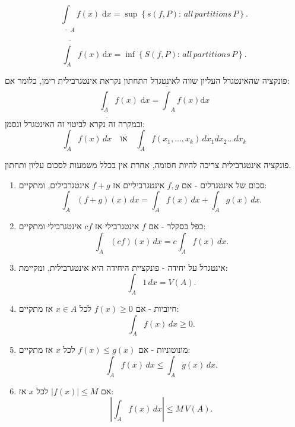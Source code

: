 \documentclass{tstextbook}
\begin{document}
\begin{definition}
$$\underline{\int}_{A}f(x) \;\mathrm{d}x=\operatorname*{sup}\left\{s(f,P):\,a l l\,p a r t i t i o n s\,P\right\}.$$

\end{definition}
\begin{definition}
$${\overline{{\int}_{A}}}f(x)\,\mathrm{d} x=\operatorname*{inf}\left\{S(f,P):\,a l l\,p a r t i t i o n s\,P\right\}.$$

\end{definition}
\begin{definition}
פונקציה שהאינטגרל העליון שווה לאינטגרל התחתון נקראת אינטגרבילית רימן, כלומר אם:
$$\underline{\int_{A}} f(x)\;\mathrm{d}x=\overline{\int}_{A}f(x)\mathrm{d}x$$
ובמקרה זה נקרא לביטוי זה האינטגרל ונסמן:
$$\int_{A}f(x)\,d x\quad \text{או}\quad\int_{A}f\left( x_{1},\ldots,x_{k} \right)\,d x_{1}d x_{2}\ldots d x_{k}$$

\end{definition}
\begin{remark}
פונקציה אינטגרבילית צריכה להיות חסומה, אחרת אין בכלל משמעות לסכום עליון ותחתון.

\end{remark}
\begin{proposition}
  \begin{enumerate}
    \item סכום של אינטגרלים - אם \(f,g\) אינטגרביליים אז \(f+g\)  אינטגרבילים, ומתקיים: 
$$\int_{A}(f+g)(x)\,d x=\int_{A}f(x)\,d x+\int_{A}g(x)\,d x.$$


    \item כפל בסקלר - אם \(f\) אינטגרבילי אז \(cf\) אינטגרבילי ומתקיים: 
$$\int_{A}(c f)(x)\,d x=c\int_{A}f(x)\,d x.$$


    \item אינטגרל על יחידה - פונקציית היחידה היא אינטגרבילית, ומקיימת: 
$$\int_{A}1\,d x=V(A).$$


    \item חיוביות - אם \(f(x)\geq 0\) לכל \(x \in A\) אז מתקיים: 
$$\int_{A}f(x)\,d x\geq0.$$


    \item מונוטוניות - אם \(f(x)\leq g(x)\) לכל \(x\) אז מתקיים: 
$$\int_{A}f(x)\,d x\leq\int_{A}g(x)\,d x.$$


    \item אם \(|f(x)|\leq M\) לכל \(x\) אז: 
$$\left|\int_{A}f(x)\,d x\right|\leq M\,V(A).$$


  \end{enumerate}
\end{proposition}
\end{document}
